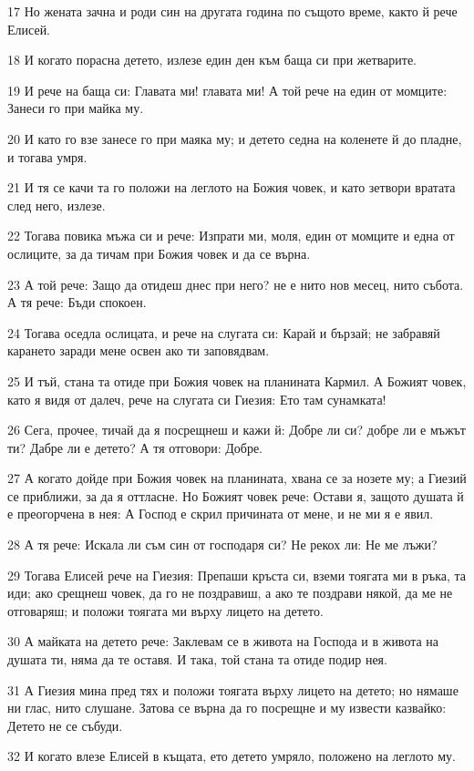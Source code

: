 \par 17 Но жената зачна и роди син на другата година по същото време, както й рече Елисей.
\par 18 И когато порасна детето, излезе един ден към баща си при жетварите.
\par 19 И рече на баща си: Главата ми! главата ми! А той рече на един от момците: Занеси го при майка му.
\par 20 И като го взе занесе го при маяка му; и детето седна на коленете й до пладне, и тогава умря.
\par 21 И тя се качи та го положи на леглото на Божия човек, и като зетвори вратата след него, излезе.
\par 22 Тогава повика мъжа си и рече: Изпрати ми, моля, един от момците и една от ослиците, за да тичам при Божия човек и да се върна.
\par 23 А той рече: Защо да отидеш днес при него? не е нито нов месец, нито събота. А тя рече: Бъди спокоен.
\par 24 Тогава оседла ослицата, и рече на слугата си: Карай и бързай; не забравяй карането заради мене освен ако ти заповядвам.
\par 25 И тъй, стана та отиде при Божия човек на планината Кармил. А Божият човек, като я видя от далеч, рече на слугата си Гиезия: Ето там сунамката!
\par 26 Сега, прочее, тичай да я посрещнеш и кажи й: Добре ли си? добре ли е мъжът ти? Дабре ли е детето? А тя отговори: Добре.
\par 27 А когато дойде при Божия човек на планината, хвана се за нозете му; а Гиезий се приближи, за да я оттласне. Но Божият човек рече: Остави я, защото душата й е преогорчена в нея: А Господ е скрил причината от мене, и не ми я е явил.
\par 28 А тя рече: Искала ли съм син от господаря си? Не рекох ли: Не ме лъжи?
\par 29 Тогава Елисей рече на Гиезия: Препаши кръста си, вземи тоягата ми в ръка, та иди; ако срещнеш човек, да го не поздравиш, а ако те поздрави някой, да ме не отговаряш; и положи тоягата ми върху лицето на детето.
\par 30 А майката на детето рече: Заклевам се в живота на Господа и в живота на душата ти, няма да те оставя. И така, той стана та отиде подир нея.
\par 31 А Гиезия мина пред тях и положи тоягата върху лицето на детето; но нямаше ни глас, нито слушане. Затова се върна да го посрещне и му извести казвайко: Детето не се събуди.
\par 32 И когато влезе Елисей в къщата, ето детето умряло, положено на леглото му.
